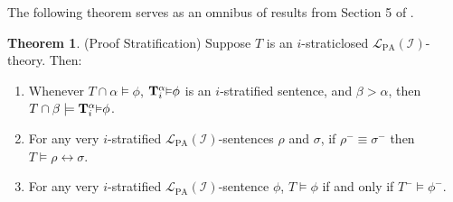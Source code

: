 \documentclass[reqno]{article}
\theoremstyle{definition}
\newtheorem{theorem}{Theorem}
\def\L{\mathscr{L}}
\def\T{\mathbf{T}}
\def\LPA{\L_{\mathrm{PA}}}
\def\indset{\mathcal I}
\newcommand{\Prr}[2]{\T^{#1}_{#2}\mbox{\small${\vDash}$}}
\begin{document}

The following theorem serves as an omnibus of results from Section 5 of \cite{carlson2000}.

\begin{theorem}
\label{proofstratification}
(Proof Stratification)
Suppose $T$ is an $i$-straticlosed $\LPA(\indset)$-theory.
Then:
\begin{enumerate}
\item Whenever $T\cap\alpha\models\phi$,
$\Prr\alpha i\phi$ is an $i$-stratified sentence,
and $\beta>\alpha$, then $T\cap\beta\models\Prr\alpha i\phi$.
\item For any very $i$-stratified $\LPA(\indset)$-sentences $\rho$ and 
$\sigma$, if $\rho^-\equiv\sigma^-$
then $T\models \rho\leftrightarrow\sigma$.
\item
For any very $i$-stratified $\LPA(\indset)$-sentence $\phi$,
$T\models\phi$ if and only if $T^-\models\phi^-$.
\end{enumerate}
\end{theorem}
\end{document}
